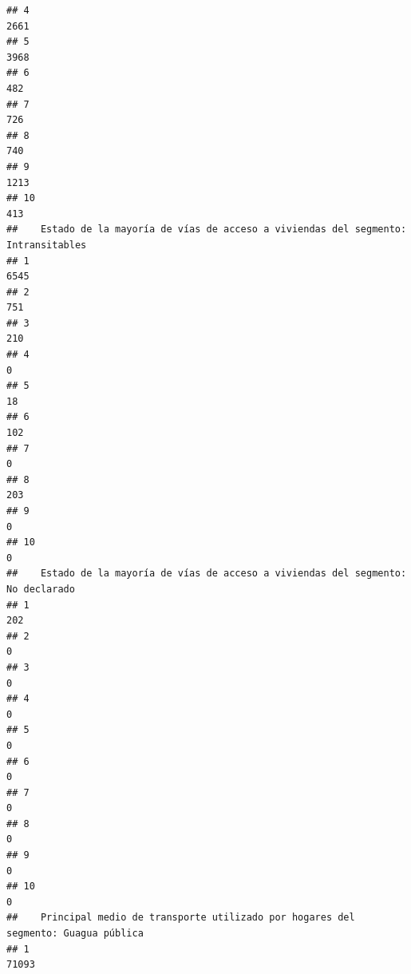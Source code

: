 \documentclass[11pt,]{article}
\begin{document}
\begin{verbatim}
## 4                                                                               2661
## 5                                                                               3968
## 6                                                                                482
## 7                                                                                726
## 8                                                                                740
## 9                                                                               1213
## 10                                                                               413
##    Estado de la mayoría de vías de acceso a viviendas del segmento: Intransitables
## 1                                                                             6545
## 2                                                                              751
## 3                                                                              210
## 4                                                                                0
## 5                                                                               18
## 6                                                                              102
## 7                                                                                0
## 8                                                                              203
## 9                                                                                0
## 10                                                                               0
##    Estado de la mayoría de vías de acceso a viviendas del segmento: No declarado
## 1                                                                            202
## 2                                                                              0
## 3                                                                              0
## 4                                                                              0
## 5                                                                              0
## 6                                                                              0
## 7                                                                              0
## 8                                                                              0
## 9                                                                              0
## 10                                                                             0
##    Principal medio de transporte utilizado por hogares del segmento: Guagua pública
## 1                                                                             71093

\end{verbatim}
\end{document}

